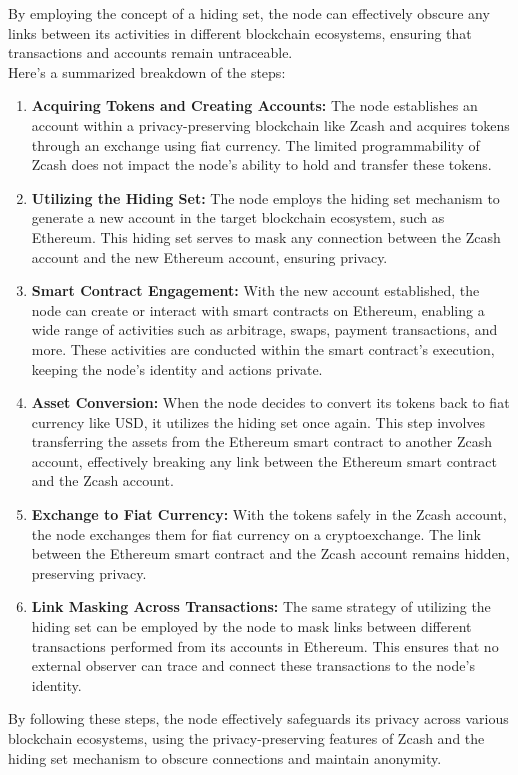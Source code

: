By employing the concept of a hiding set, the node can effectively obscure any links between its activities in different blockchain ecosystems, ensuring that transactions and accounts remain untraceable.\\
Here's a summarized breakdown of the steps:
\begin{enumerate}
	\item \textbf{Acquiring Tokens and Creating Accounts:} The node establishes an account within a privacy-preserving blockchain like Zcash and acquires tokens through an exchange using fiat currency. The limited programmability of Zcash does not impact the node's ability to hold and transfer these tokens.
	\item \textbf{Utilizing the Hiding Set:} The node employs the hiding set mechanism to generate a new account in the target blockchain ecosystem, such as Ethereum. This hiding set serves to mask any connection between the Zcash account and the new Ethereum account, ensuring privacy.
	\item \textbf{Smart Contract Engagement:} With the new account established, the node can create or interact with smart contracts on Ethereum, enabling a wide range of activities such as arbitrage, swaps, payment transactions, and more. These activities are conducted within the smart contract's execution, keeping the node's identity and actions private.
	\item \textbf{Asset Conversion:} When the node decides to convert its tokens back to fiat currency like USD, it utilizes the hiding set once again. This step involves transferring the assets from the Ethereum smart contract to another Zcash account, effectively breaking any link between the Ethereum smart contract and the Zcash account.
	\item \textbf{Exchange to Fiat Currency:} With the tokens safely in the Zcash account, the node exchanges them for fiat currency on a cryptoexchange. The link between the Ethereum smart contract and the Zcash account remains hidden, preserving privacy.
	\item \textbf{Link Masking Across Transactions:} The same strategy of utilizing the hiding set can be employed by the node to mask links between different transactions performed from its accounts in Ethereum. This ensures that no external observer can trace and connect these transactions to the node's identity.
\end{enumerate}
By following these steps, the node effectively safeguards its privacy across various blockchain ecosystems, using the privacy-preserving features of Zcash and the hiding set mechanism to obscure connections and maintain anonymity.
